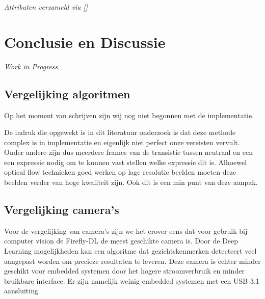 \documentclass[11pt]{article}
\begin{document}
    \emph{Attributen verzameld via []}


    \scriptsize{
    }



    \section{Conclusie en Discussie}\label{sec:conclusie-en-discussie}
    \emph{Work in Progress}
    \subsection{Vergelijking algoritmen}
    Op het moment van schrijven zijn wij nog niet begonnen met de implementatie.



    De indruk die opgewekt is in dit literatuur onderzoek is dat deze methode complex is in implementatie en eigenlijk niet perfect onze vereisten vervult.
    Onder andere zijn dus meerdere frames van de transistie tussen neutraal en een een expressie nodig om te kunnen vast stellen welke expressie dit is.
    Alhoewel optical flow technieken goed werken op lage resolutie beelden moeten deze beelden verder van hoge kwaliteit zijn.
    Ook dit is een min punt van deze aanpak.

    \subsection{Vergelijking camera's}
    Voor de vergelijking van camera's zijn we het erover eens dat voor gebruik bij computer vision de Firefly-DL de meest geschikte camera is.
    Door de Deep Learning mogelijkheden kan een algoritme dat gezichtskenmerken detecteert veel aangepast worden om precieze resultaten te leveren.
    Deze camera is echter minder geschikt voor embedded systemen door het hogere stroomverbruik en minder bruikbare interface.
    Er zijn namelijk weinig embedded systemen met een USB 3.1 aansluiting\footnotemark[3]
\end{document}
